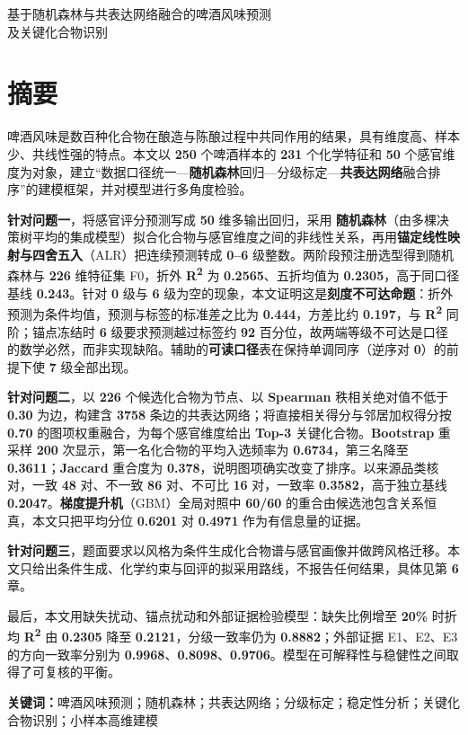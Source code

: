 \begin{center}
{\heiti{} 基于随机森林与共表达网络融合的啤酒风味预测}\\[0.25em]
{\heiti{} 及关键化合物识别}
\end{center}

\vspace{0.6em}

\section{摘要}

啤酒风味是数百种化合物在酿造与陈酿过程中共同作用的结果，具有维度高、样本少、共线性强的特点。本文以 \textbf{250} 个啤酒样本的 \textbf{231} 个化学特征和 \textbf{50} 个感官维度为对象，建立“数据口径统一—\textbf{随机森林}回归—分级标定—\textbf{共表达网络}融合排序”的建模框架，并对模型进行多角度检验。

\textbf{针对问题一}，将感官评分预测写成 \textbf{50} 维多输出回归，采用 \textbf{随机森林}（由多棵决策树平均的集成模型）拟合化合物与感官维度之间的非线性关系，再用\textbf{锚定线性映射与四舍五入}（ALR）把连续预测转成 \textbf{0--6} 级整数。两阶段预注册选型得到随机森林与 \textbf{226} 维特征集 F0，折外 \textbf{R\textsuperscript{2}} 为 \textbf{0.2565}、五折均值为 \textbf{0.2305}，高于同口径基线 \textbf{0.243}。针对 \textbf{0} 级与 \textbf{6} 级为空的现象，本文证明这是\textbf{刻度不可达命题}：折外预测为条件均值，预测与标签的标准差之比为 \textbf{0.444}，方差比约 \textbf{0.197}，与 \textbf{R\textsuperscript{2}} 同阶；锚点冻结时 \textbf{6} 级要求预测越过标签约 \textbf{92} 百分位，故两端等级不可达是口径的数学必然，而非实现缺陷。辅助的\textbf{可读口径}表在保持单调同序（逆序对 \textbf{0}）的前提下使 \textbf{7} 级全部出现。

\textbf{针对问题二}，以 \textbf{226} 个候选化合物为节点、以 \textbf{Spearman} 秩相关绝对值不低于 \textbf{0.30} 为边，构建含 \textbf{3758} 条边的共表达网络；将直接相关得分与邻居加权得分按 \textbf{0.70} 的图项权重融合，为每个感官维度给出 \textbf{Top-3} 关键化合物。\textbf{Bootstrap} 重采样 \textbf{200} 次显示，第一名化合物的平均入选频率为 \textbf{0.6734}，第三名降至 \textbf{0.3611}；\textbf{Jaccard} 重合度为 \textbf{0.378}，说明图项确实改变了排序。以来源品类核对，一致 \textbf{48} 对、不一致 \textbf{86} 对、不可比 \textbf{16} 对，一致率 \textbf{0.3582}，高于独立基线 \textbf{0.2047}。\textbf{梯度提升机}（GBM）全局对照中 \textbf{60/60} 的重合由候选池包含关系恒真，本文只把平均分位 \textbf{0.6201} 对 \textbf{0.4971} 作为有信息量的证据。

\textbf{针对问题三}，题面要求以风格为条件生成化合物谱与感官画像并做跨风格迁移。本文只给出条件生成、化学约束与回评的拟采用路线，不报告任何结果，具体见第 \textbf{6} 章。

最后，本文用缺失扰动、锚点扰动和外部证据检验模型：缺失比例增至 \textbf{20\%} 时折均 \textbf{R\textsuperscript{2}} 由 \textbf{0.2305} 降至 \textbf{0.2121}，分级一致率仍为 \textbf{0.8882}；外部证据 E1、E2、E3 的方向一致率分别为 \textbf{0.9968}、\textbf{0.8098}、\textbf{0.9706}。模型在可解释性与稳健性之间取得了可复核的平衡。

\noindent\textbf{关键词：}啤酒风味预测；随机森林；共表达网络；分级标定；稳定性分析；关键化合物识别；小样本高维建模
